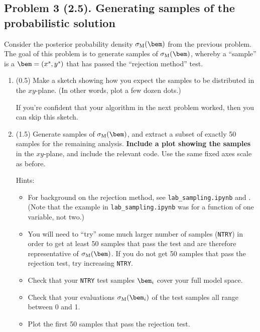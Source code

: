 \documentclass[11pt,titlepage,fleqn]{article}
\begin{document}

\pagebreak
\subsection*{Problem 3 (2.5). Generating samples of the probabilistic solution}

Consider the posterior probability density $\sigma_{\rm M}(\bem)$ from the previous problem. The goal of this problem is to generate samples of $\sigma_{\rm M}(\bem)$, whereby a ``sample'' is a $\bem = (x^s,y^s)$ that has passed the ``rejection method'' test.

\begin{enumerate}
\item (0.5) Make a sketch showing how you expect the samples to be distributed in the $xy$-plane. (In other words, plot a few dozen dots.)

If you're confident that your algorithm in the next problem worked, then you can skip this sketch.

\item (1.5) Generate samples of $\sigma_{\rm M}(\bem)$, and extract a subset of exactly 50 samples for the remaining analysis.
{\bf Include a plot showing the samples} in the $xy$-plane, and include the relevant code.
Use the same fixed axes scale as before.

Hints:
%
\begin{itemize}
\item For background on the rejection method, see \verb+lab_sampling.ipynb+ and \citet[][Section~2.3.2]{Tarantola2005}. (Note that the example in \verb+lab_sampling.ipynb+ was for a function of one variable, not two.) 

\item You will need to ``try'' some much larger number of samples (\verb+NTRY+) in order to get at least 50 samples that pass the test and are therefore representative of $\sigma_{\rm M}(\bem)$. If you do not get 50 samples that pass the rejection test, try increasing \verb+NTRY+.

\item Check that your \verb+NTRY+ test samples $\bem_i$ cover your full model space.

\item Check that your evaluations $\sigma_{\rm M}(\bem_i)$ of the test samples all range between 0 and 1.

\item Plot the first 50 samples that pass the rejection test.
\end{itemize}


\end{enumerate}
\end{document}
